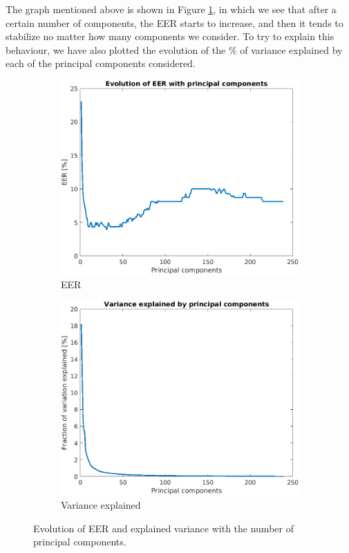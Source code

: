\documentclass[11pt]{article}
\begin{document}
The graph mentioned above is shown in Figure \ref{fig:ex2b}, in which we see that after a certain number of components, the EER starts to increase, and then it tends to stabilize no matter how many components we consider. To try to explain this behaviour, we have also plotted the evolution of the $\%$ of variance explained by each of the principal components considered.

\begin{figure}[h!]
  \centering
       \begin{subfigure}[t]{0.4\textwidth}
         \centering
         \includegraphics[scale=0.5]{img/2b_eer}
         \caption{EER}
     \end{subfigure}%
     \quad\quad
     \begin{subfigure}[t]{0.4\textwidth}
         \centering
         \includegraphics[scale=0.5]{img/2b_var}
         \caption{Variance explained}
     \end{subfigure}
    \caption{Evolution of EER and explained variance with the number of principal components.}
    \label{fig:ex2b}
\end{figure}
\end{document}
